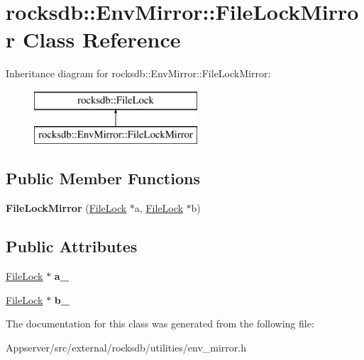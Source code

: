 \hypertarget{classrocksdb_1_1EnvMirror_1_1FileLockMirror}{}\section{rocksdb\+:\+:Env\+Mirror\+:\+:File\+Lock\+Mirror Class Reference}
\label{classrocksdb_1_1EnvMirror_1_1FileLockMirror}
Inheritance diagram for rocksdb\+:\+:Env\+Mirror\+:\+:File\+Lock\+Mirror\+:\begin{figure}[H]
\begin{center}
\leavevmode
\includegraphics[height=2.000000cm]{classrocksdb_1_1EnvMirror_1_1FileLockMirror}
\end{center}
\end{figure}
\subsection*{Public Member Functions}
\begin{DoxyCompactItemize}
\item 
{\bfseries File\+Lock\+Mirror} (\hyperlink{classrocksdb_1_1FileLock}{File\+Lock} $\ast$a, \hyperlink{classrocksdb_1_1FileLock}{File\+Lock} $\ast$b)\hypertarget{classrocksdb_1_1EnvMirror_1_1FileLockMirror_ada51022b02a97f0a72b7b79416bbae44}{}\label{classrocksdb_1_1EnvMirror_1_1FileLockMirror_ada51022b02a97f0a72b7b79416bbae44}

\end{DoxyCompactItemize}
\subsection*{Public Attributes}
\begin{DoxyCompactItemize}
\item 
\hyperlink{classrocksdb_1_1FileLock}{File\+Lock} $\ast$ {\bfseries a\+\_\+}\hypertarget{classrocksdb_1_1EnvMirror_1_1FileLockMirror_a535762d761699ce90fd9051b58f4d275}{}\label{classrocksdb_1_1EnvMirror_1_1FileLockMirror_a535762d761699ce90fd9051b58f4d275}

\item 
\hyperlink{classrocksdb_1_1FileLock}{File\+Lock} $\ast$ {\bfseries b\+\_\+}\hypertarget{classrocksdb_1_1EnvMirror_1_1FileLockMirror_a611b7e46ab9cbea5e8fee68258f3031a}{}\label{classrocksdb_1_1EnvMirror_1_1FileLockMirror_a611b7e46ab9cbea5e8fee68258f3031a}

\end{DoxyCompactItemize}


The documentation for this class was generated from the following file\+:\begin{DoxyCompactItemize}
\item 
Appserver/src/external/rocksdb/utilities/env\+\_\+mirror.\+h\end{DoxyCompactItemize}
